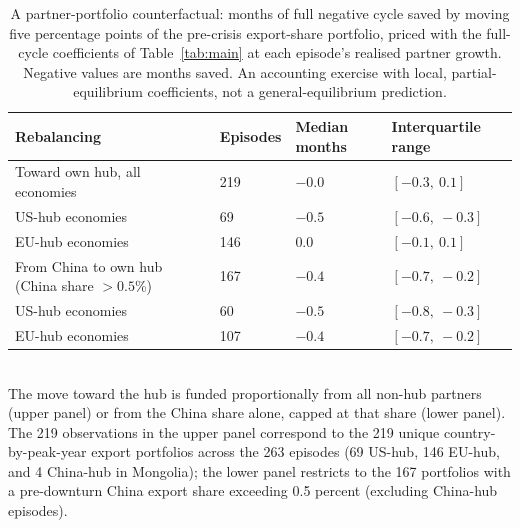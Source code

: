 \begin{table}[H]
\centering\small
\caption{A partner-portfolio counterfactual: months of full negative cycle saved by moving five percentage points of the pre-crisis export-share portfolio, priced with the full-cycle coefficients of Table~\ref{tab:main} at each episode's realised partner growth. Negative values are months saved. An accounting exercise with local, partial-equilibrium coefficients, not a general-equilibrium prediction.}
\label{tab:counterfactual}
\begin{tabularx}{\textwidth}{@{}lYYY@{}}
\toprule
Rebalancing & Episodes & Median months & Interquartile range \\ \midrule
Toward own hub, all economies & 219 & $-0.0$ & $[-0.3,\ 0.1]$ \\
\quad US-hub economies & 69 & $-0.5$ & $[-0.6,\ -0.3]$ \\
\quad EU-hub economies & 146 & $0.0$ & $[-0.1,\ 0.1]$ \\
\midrule
From China to own hub (China share $>0.5$\%) & 167 & $-0.4$ & $[-0.7,\ -0.2]$ \\
\quad US-hub economies & 60 & $-0.5$ & $[-0.8,\ -0.3]$ \\
\quad EU-hub economies & 107 & $-0.4$ & $[-0.7,\ -0.2]$ \\
\bottomrule
\end{tabularx}
\\[2pt]\footnotesize{The move toward the hub is funded proportionally from all non-hub partners (upper panel) or from the China share alone, capped at that share (lower panel). The 219 observations in the upper panel correspond to the 219 unique country-by-peak-year export portfolios across the 263 episodes (69 US-hub, 146 EU-hub, and 4 China-hub in Mongolia); the lower panel restricts to the 167 portfolios with a pre-downturn China export share exceeding 0.5 percent (excluding China-hub episodes).}
\end{table}
